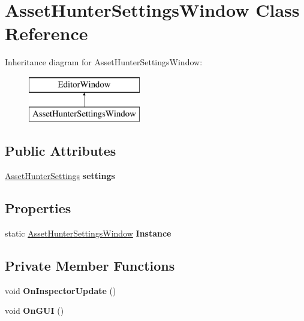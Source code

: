 \hypertarget{class_asset_hunter_settings_window}{}\section{Asset\+Hunter\+Settings\+Window Class Reference}
\label{class_asset_hunter_settings_window}
Inheritance diagram for Asset\+Hunter\+Settings\+Window\+:\begin{figure}[H]
\begin{center}
\leavevmode
\includegraphics[height=2.000000cm]{class_asset_hunter_settings_window}
\end{center}
\end{figure}
\subsection*{Public Attributes}
\begin{DoxyCompactItemize}
\item 
\mbox{\label{class_asset_hunter_settings_window_a539dc67240430ad6850297b7f0656e45}} 
\hyperlink{class_heureka_games_1_1_asset_hunter_settings}{Asset\+Hunter\+Settings} {\bfseries settings}
\end{DoxyCompactItemize}
\subsection*{Properties}
\begin{DoxyCompactItemize}
\item 
\mbox{\label{class_asset_hunter_settings_window_ad80b00acda831020ae32e58870455a86}} 
static \hyperlink{class_asset_hunter_settings_window}{Asset\+Hunter\+Settings\+Window} {\bfseries Instance}
\end{DoxyCompactItemize}
\subsection*{Private Member Functions}
\begin{DoxyCompactItemize}
\item 
\mbox{\label{class_asset_hunter_settings_window_a89cddebba95d0347cff3f44ce3ff4feb}} 
void {\bfseries On\+Inspector\+Update} ()
\item 
\mbox{\label{class_asset_hunter_settings_window_ab5d29032708a23f54b7e5ab8ce4ff813}} 
void {\bfseries On\+G\+UI} ()
\end{DoxyCompactItemize}
